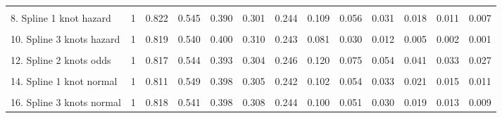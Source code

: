 \documentclass[
]{article}
\begin{document}
{\begin{tabular}{lrrrrrrrrrrrr}
\cellcolor{gray!6}{7. Generalised Gamma} & \cellcolor{gray!6}{1} & \cellcolor{gray!6}{0.810} & \cellcolor{gray!6}{0.555} & \cellcolor{gray!6}{0.399} & \cellcolor{gray!6}{0.302} & \cellcolor{gray!6}{0.237} & \cellcolor{gray!6}{0.100} & \cellcolor{gray!6}{0.057} & \cellcolor{gray!6}{0.037} & \cellcolor{gray!6}{0.026} & \cellcolor{gray!6}{0.019} & \cellcolor{gray!6}{0.015}\\
8. Spline 1 knot hazard & 1 & 0.822 & 0.545 & 0.390 & 0.301 & 0.244 & 0.109 & 0.056 & 0.031 & 0.018 & 0.011 & 0.007\\
\cellcolor{gray!6}{9. Spline 2 knots hazard} & \cellcolor{gray!6}{1} & \cellcolor{gray!6}{0.817} & \cellcolor{gray!6}{0.546} & \cellcolor{gray!6}{0.396} & \cellcolor{gray!6}{0.305} & \cellcolor{gray!6}{0.243} & \cellcolor{gray!6}{0.096} & \cellcolor{gray!6}{0.043} & \cellcolor{gray!6}{0.021} & \cellcolor{gray!6}{0.010} & \cellcolor{gray!6}{0.005} & \cellcolor{gray!6}{0.003}\\
10. Spline 3 knots hazard & 1 & 0.819 & 0.540 & 0.400 & 0.310 & 0.243 & 0.081 & 0.030 & 0.012 & 0.005 & 0.002 & 0.001\\
\cellcolor{gray!6}{11. Spline 1 knot odds} & \cellcolor{gray!6}{1} & \cellcolor{gray!6}{0.820} & \cellcolor{gray!6}{0.542} & \cellcolor{gray!6}{0.390} & \cellcolor{gray!6}{0.303} & \cellcolor{gray!6}{0.248} & \cellcolor{gray!6}{0.127} & \cellcolor{gray!6}{0.082} & \cellcolor{gray!6}{0.060} & \cellcolor{gray!6}{0.047} & \cellcolor{gray!6}{0.038} & \cellcolor{gray!6}{0.032}\\
12. Spline 2 knots odds & 1 & 0.817 & 0.544 & 0.393 & 0.304 & 0.246 & 0.120 & 0.075 & 0.054 & 0.041 & 0.033 & 0.027\\
\cellcolor{gray!6}{13. Spline 3 knots odds} & \cellcolor{gray!6}{1} & \cellcolor{gray!6}{0.818} & \cellcolor{gray!6}{0.542} & \cellcolor{gray!6}{0.398} & \cellcolor{gray!6}{0.308} & \cellcolor{gray!6}{0.246} & \cellcolor{gray!6}{0.110} & \cellcolor{gray!6}{0.065} & \cellcolor{gray!6}{0.044} & \cellcolor{gray!6}{0.033} & \cellcolor{gray!6}{0.026} & \cellcolor{gray!6}{0.021}\\
14. Spline 1 knot normal & 1 & 0.811 & 0.549 & 0.398 & 0.305 & 0.242 & 0.102 & 0.054 & 0.033 & 0.021 & 0.015 & 0.011\\
\cellcolor{gray!6}{15. Spline 2 knots normal} & \cellcolor{gray!6}{1} & \cellcolor{gray!6}{0.815} & \cellcolor{gray!6}{0.546} & \cellcolor{gray!6}{0.392} & \cellcolor{gray!6}{0.303} & \cellcolor{gray!6}{0.245} & \cellcolor{gray!6}{0.113} & \cellcolor{gray!6}{0.065} & \cellcolor{gray!6}{0.042} & \cellcolor{gray!6}{0.029} & \cellcolor{gray!6}{0.021} & \cellcolor{gray!6}{0.016}\\
16. Spline 3 knots normal & 1 & 0.818 & 0.541 & 0.398 & 0.308 & 0.244 & 0.100 & 0.051 & 0.030 & 0.019 & 0.013 & 0.009\\
\bottomrule
\end{tabular}}
\end{document}
